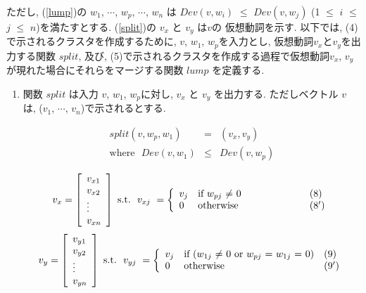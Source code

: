 \noindent 
ただし, (\ref{lump})の $w_{1}$, $\cdots$, $w_{p}$, $\cdots$, $w_{n}$ 
は $Dev(v, w_{i})$ $\leq$ $Dev(v, w_{j})$ (1 $\leq$ $i$ $\leq$ $j$
$\leq$ $n$)を満たすとする.  (\ref{split})の $v_{x}$ と $v_{y}$ は$v$の
仮想動詞を示す.  以下では, (4)で示されるクラスタを作成するために,  \hspace{-0.1mm}$v$,  \hspace{-0.1mm}$w_{1}$, \hspace{-0.1mm}$w_{p}$を入力とし, 仮想動詞$v_{x}$\hspace{-0.1mm}と\hspace{-0.1mm}$v_{y}$を出力する関数 
$split$, 及び, \hspace{-0.1mm}(5)で示されるクラスタを作成する過程で仮想動詞$v_{x}$,
$v_{y}$が現れた場合にそれらをマージする関数 $lump$ を定義する.

\begin{enumerate}

\item 関数 $split$ は入力 $v$,
$w_{1}$, $w_{p}$に対し, $v_{x}$ と $v_{y}$ を出力する.  ただしベクトル 
$v$ は, ($v_{1}$, $\cdots$, $v_{n}$)で示されるとする.


\begin{eqnarray}
split(v,w_{p},w_{1}) & = & (v_{x},v_{y}) \label{sp} \\
\mbox{where} \ \ \ Dev(v, w_{1}) & \leq & Dev(v, w_{p}) 
\end{eqnarray}

\vspace*{-2mm}
\[ 
	v_{x}  = \left[ \begin{array}{l}
		v_{x1} \\
		v_{x2} \\
		\vdots \\
		v_{xn} 
		\end{array} \right] \  \hbox{s.t.} \ \
v_{xj} \  = \left\{ \begin{array}{lll}
	v_{j}  &\mbox{if $w_{pj}$ $\neq$ 0} &(8)   \nonumber \\
	0 & \mbox{otherwise} \hspace*{2.2cm} &(8') \nonumber
	\end{array}
           \right. 
\]
\[
 v_{y}  = \left[ \begin{array}{l}
		v_{y1} \\
		v_{y2} \\
		\vdots \\
		v_{yn} 
		\end{array} \right] \  \hbox{s.t.} \ \
v_{yj} \  = \left\{ \begin{array}{lll}
	v_{j}  &\mbox{if ($w_{1j}$ $\neq$ 0 or $w_{pj}$ = $w_{1j}$ =
0)} &(9)  \nonumber \\
	0 & \mbox{otherwise} &(9')   \nonumber
	\end{array}
           \right. 
\]
\addtocounter{equation}{2}


\end{enumerate}
